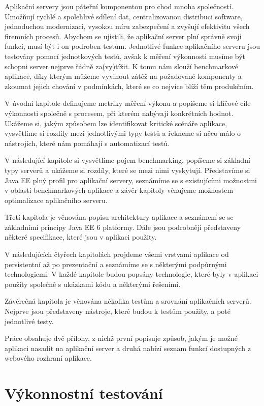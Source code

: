 \documentclass[122pt,oneside]{fithesis}
\begin{document}
Aplikační servery jsou páteřní komponentou pro chod mnoha společností. Umožňují rychlé a spolehlivé sdílení dat, centralizovanou distribuci software, jednoduchou modernizaci, vysokou míru zabezpečení a zvyšují efektivitu všech firemních procesů. Abychom se ujistili, že aplikační server plní správně svoji funkci, musí být i on podroben testům. Jednotlivé funkce aplikačního serveru jsou testovány pomocí jednotkových testů, avšak k měření výkonnosti musíme být schopni server nejprve řádně za(vy)tížit. K tomu nám slouží benchmarkové aplikace, díky kterým můžeme vyvinout zátěž na požadované komponenty a zkoumat jejich chování v podmínkách, které se co nejvíce blíží těm produkčním.

V úvodní kapitole definujeme metriky měření výkonu a popíšeme si klíčové cíle výkonnosti společně s procesem, při kterém nabývají konkrétních hodnot. Ukážeme si, jakým způsobem lze identifikovat kritické scénáře aplikace, vysvětlíme si rozdíly mezi jednotlivými typy testů a řekneme si něco málo o nástrojích, které nám pomáhají s automatizací testů.

V následující kapitole si vysvětlíme pojem benchmarking, popíšeme si základní typy serverů a ukážeme si rozdíly, které se mezi nimi vyskytují. Představíme si Java EE plný profil pro aplikační servery, seznámíme se s existujícími možnostmi v oblasti benchmarkových aplikace a závěr kapitoly věnujeme možnostem optimalizace aplikačního serveru.

Třetí kapitola je věnována popisu architektury aplikace a seznámení se se základními principy Java EE 6 platformy. Dále jsou podrobněji představeny některé specifikace, které jsou v aplikaci použity.

V následujících čtyřech kapitolách projdeme všemi vrstvami aplikace od persistentní až po prezentační a seznámíme se s některými podpůrnými technologiemi. V každé kapitole budou popsány technologie, které byly v aplikaci použity společně s ukázkami kódu a některými řešeními.

Závěrečná kapitola je věnována několika testům a srovnání aplikačních serverů. Nejprve jsou představeny nástroje, které budou k testům použity, a poté jednotlivé testy.

Práce obsahuje dvě přílohy, z nichž první popisuje způsob, jakým je možné aplikaci nasadit na aplikační server a druhá nabízí seznam funkcí dostupných z webového rozhraní aplikace.

\chapter{Výkonnostní testování}
\end{document}
